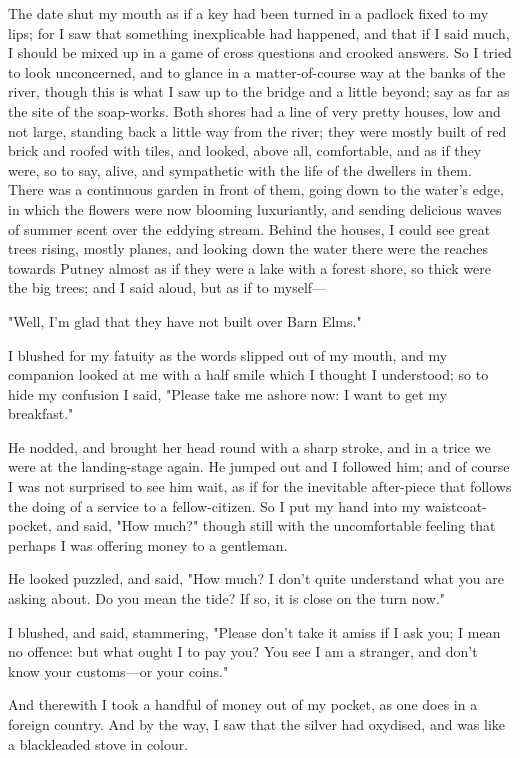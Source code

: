 The date shut my mouth as if a key had been turned in a padlock fixed to
my lips; for I saw that something inexplicable had happened, and that if
I said much, I should be mixed up in a game of cross questions and
crooked answers. So I tried to look unconcerned, and to glance in a
matter-of-course way at the banks of the river, though this is what I
saw up to the bridge and a little beyond; say as far as the site of the
soap-works. Both shores had a line of very pretty houses, low and not
large, standing back a little way from the river; they were mostly built
of red brick and roofed with tiles, and looked, above all, comfortable,
and as if they were, so to say, alive, and sympathetic with the life of
the dwellers in them. There was a continuous garden in front of them,
going down to the water's edge, in which the flowers were now blooming
luxuriantly, and sending delicious waves of summer scent over the
eddying stream. Behind the houses, I could see great trees rising,
mostly planes, and looking down the water there were the reaches towards
Putney almost as if they were a lake with a forest shore, so thick were
the big trees; and I said aloud, but as if to myself---

"Well, I'm glad that they have not built over Barn Elms."

I blushed for my fatuity as the words slipped out of my mouth, and my
companion looked at me with a half smile which I thought I understood;
so to hide my confusion I said, "Please take me ashore now: I want to
get my breakfast."

He nodded, and brought her head round with a sharp stroke, and in a
trice we were at the landing-stage again. He jumped out and I followed
him; and of course I was not surprised to see him wait, as if for the
inevitable after-piece that follows the doing of a service to a
fellow-citizen. So I put my hand into my waistcoat-pocket, and said,
"How much?" though still with the uncomfortable feeling that perhaps I
was offering money to a gentleman.

He looked puzzled, and said, "How much? I don't quite understand what
you are asking about. Do you mean the tide? If so, it is close on the
turn now."

I blushed, and said, stammering, "Please don't take it amiss if I ask
you; I mean no offence: but what ought I to pay you? You see I am a
stranger, and don't know your customs---or your coins."

And therewith I took a handful of money out of my pocket, as one does in
a foreign country. And by the way, I saw that the silver had oxydised,
and was like a blackleaded stove in colour.

